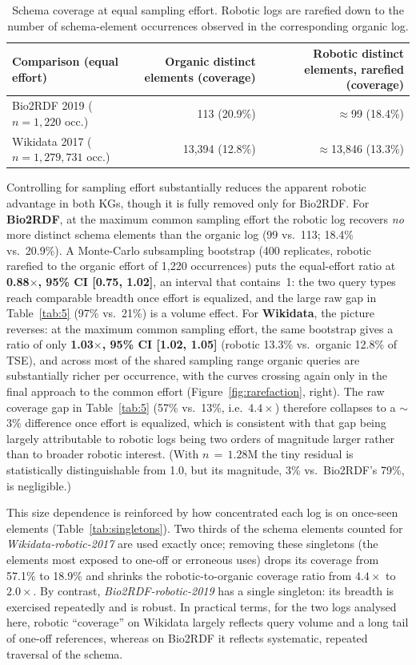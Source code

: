\documentclass[sw]{iosart2x}
\begin{document}
\begin{table}[ht]
\centering
\caption{Schema coverage at equal sampling effort. Robotic logs are rarefied down to the number of schema-element occurrences observed in the corresponding organic log.}
\label{tab:rarefaction}
\begin{tabular}{l|r|r}
\hline
Comparison (equal effort) & Organic distinct elements (coverage) & Robotic distinct elements, rarefied (coverage) \\
\hline
Bio2RDF 2019 ($n=1{,}220$ occ.) & 113 (20.9\%) & $\approx$99 (18.4\%) \\
Wikidata 2017 ($n=1{,}279{,}731$ occ.) & 13,394 (12.8\%) & $\approx$13,846 (13.3\%) \\
\hline
\end{tabular}
\end{table}

Controlling for sampling effort substantially reduces the apparent robotic advantage in both KGs, though it is fully removed only for Bio2RDF. For \textbf{Bio2RDF}, at the maximum common sampling effort the robotic log recovers \emph{no} more distinct schema elements than the organic log (99 vs.\ 113; 18.4\% vs.\ 20.9\%). A Monte-Carlo subsampling bootstrap (400 replicates, robotic rarefied to the organic effort of 1{,}220 occurrences) puts the equal-effort ratio at \textbf{0.88$\times$, 95\% CI [0.75, 1.02]}, an interval that contains~1: the two query types reach comparable breadth once effort is equalized, and the large raw gap in Table~\ref{tab:5} (97\% vs.\ 21\%) is a volume effect. For \textbf{Wikidata}, the picture reverses: at the maximum common sampling effort, the same bootstrap gives a ratio of only \textbf{1.03$\times$, 95\% CI [1.02, 1.05]} (robotic 13.3\% vs.\ organic 12.8\% of TSE), and across most of the shared sampling range organic queries are substantially richer per occurrence, with the curves crossing again only in the final approach to the common effort (Figure~\ref{fig:rarefaction}, right). The raw coverage gap in Table~\ref{tab:5} (57\% vs.\ 13\%, i.e.\ $4.4\times$) therefore collapses to a $\sim$3\% difference once effort is equalized, which is consistent with that gap being largely attributable to robotic logs being two orders of magnitude larger rather than to broader robotic interest. (With $n\,{=}\,1.28$M the tiny residual is statistically distinguishable from 1.0, but its magnitude, 3\% vs.\ Bio2RDF's 79\%, is negligible.)

This size dependence is reinforced by how concentrated each log is on once-seen elements (Table~\ref{tab:singletons}). Two thirds of the schema elements counted for \emph{Wikidata-robotic-2017} are used exactly once; removing these singletons (the elements most exposed to one-off or erroneous uses) drops its coverage from 57.1\% to 18.9\% and shrinks the robotic-to-organic coverage ratio from $4.4\times$ to $2.0\times$. By contrast, \emph{Bio2RDF-robotic-2019} has a single singleton: its breadth is exercised repeatedly and is robust. In practical terms, for the two logs analysed here, robotic ``coverage'' on Wikidata largely reflects query volume and a long tail of one-off references, whereas on Bio2RDF it reflects systematic, repeated traversal of the schema. 
\end{document}
